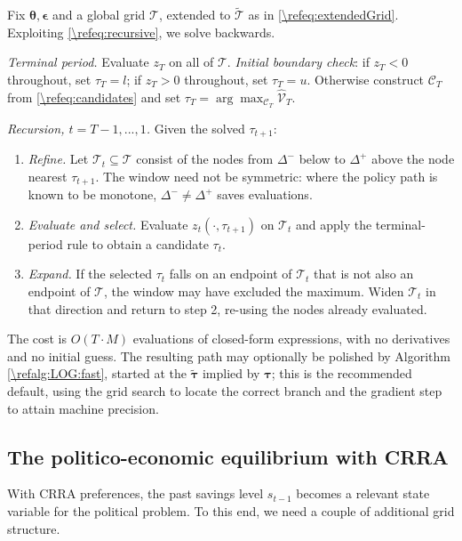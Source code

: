 \documentclass[a4paper]{article}
\begin{document}
\begin{alg}\label{\refalg:LOG:gridsearch}
Fix $\bm{\theta},\bm{\epsilon}$ and a global grid $\mathcal{T}$, extended to $\tilde{\mathcal{T}}$ as in \eqref{\refeq:extendedGrid}. Exploiting \eqref{\refeq:recursive}, we solve backwards.

\smallskip\noindent\emph{Terminal period.} Evaluate $z_T$ on all of $\mathcal{T}$. \emph{Initial boundary check}: if $z_T<0$ throughout, set $\tau_T = l$; if $z_T>0$ throughout, set $\tau_T = u$. Otherwise construct $\mathcal{C}_T$ from \eqref{\refeq:candidates} and set $\tau_T = \arg\max_{\mathcal{C}_T}\hat{\mathcal{V}}_T$.

\smallskip\noindent\emph{Recursion, $t = T-1,...,1$.} Given the solved $\tau_{t+1}$:
\begin{enumerate}
    \item \emph{Refine.} Let $\mathcal{T}_t\subseteq\mathcal{T}$ consist of the nodes from $\Delta^-$ below to $\Delta^+$ above the node nearest $\tau_{t+1}$. The window need not be symmetric: where the policy path is known to be monotone, $\Delta^-\neq\Delta^+$ saves evaluations.
    \item \emph{Evaluate and select.} Evaluate $z_t(\cdot,\tau_{t+1})$ on $\mathcal{T}_t$ and apply the terminal-period rule to obtain a candidate $\tau_t$.
    \item \emph{Expand.} If the selected $\tau_t$ falls on an endpoint of $\mathcal{T}_t$ that is not also an endpoint of $\mathcal{T}$, the window may have excluded the maximum. Widen $\mathcal{T}_t$ in that direction and return to step 2, re-using the nodes already evaluated.
\end{enumerate}
The cost is $O(T\cdot M)$ evaluations of closed-form expressions, with no derivatives and no initial guess. The resulting path may optionally be polished by Algorithm \ref{\refalg:LOG:fast}, started at the $\tilde{\bm{\tau}}$ implied by $\bm{\tau}$; this is the recommended default, using the grid search to locate the correct branch and the gradient step to attain machine precision.
\end{alg}



\subsection{The politico-economic equilibrium with CRRA}\label{\refsec:PEE}
With CRRA preferences, the past savings level $s_{t-1}$ becomes a relevant state variable for the political problem. To this end, we need a couple of additional grid structure. 
\end{document}
